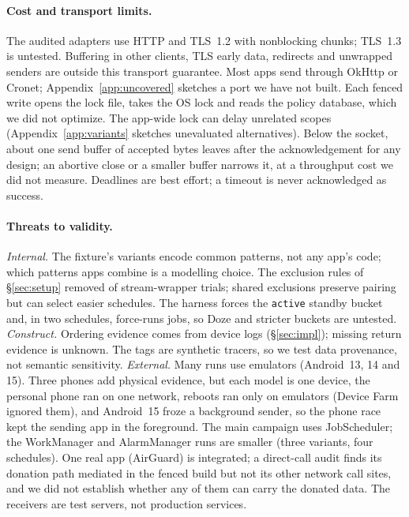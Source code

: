 \paragraph{Cost and transport limits.} The audited adapters use HTTP and TLS~1.2 with nonblocking chunks; TLS~1.3 is untested. Buffering in other clients, TLS early data, redirects and unwrapped senders are outside this transport guarantee. Most apps send through OkHttp or Cronet; Appendix~\ref{app:uncovered} sketches a port we have not built. Each fenced write opens the lock file, takes the OS lock and reads the policy database, which we did not optimize. The app-wide lock can delay unrelated scopes (Appendix~\ref{app:variants} sketches unevaluated alternatives). Below the socket, about one send buffer of accepted bytes leaves after the acknowledgement for any design; an abortive close or a smaller buffer narrows it, at a throughput cost we did not measure. Deadlines are best effort; a timeout is never acknowledged as success.

\paragraph{Threats to validity.}
\emph{Internal.} The fixture's variants encode common patterns, not any app's code; which patterns apps combine is a
modelling choice. The exclusion rules of \S\ref{sec:setup} removed \nInvalid{} of \nTrialsTotal{} stream-wrapper trials;
shared exclusions preserve pairing but can select easier schedules. The harness forces the \texttt{active} standby bucket
and, in two schedules, force-runs jobs, so Doze and stricter buckets are untested.
\emph{Construct.} Ordering evidence comes from device logs (\S\ref{sec:impl}); missing return evidence is unknown. The
tags are synthetic tracers, so we test data provenance, not semantic sensitivity.
\emph{External.} Many runs use emulators (Android~13, 14 and 15). Three phones add physical evidence, but each model is
one device, the personal phone ran on one network, reboots ran only on emulators (Device Farm ignored them), and
Android~15 froze a background sender, so the phone race kept the sending app in the foreground. The main campaign uses JobScheduler; the WorkManager and AlarmManager runs are smaller
(three variants, four schedules). One real app (AirGuard) is integrated; a direct-call audit finds its donation path mediated in the fenced build but
not its other network call sites, and we did not establish whether any of them can carry the donated data. The receivers are test
servers, not production services.
